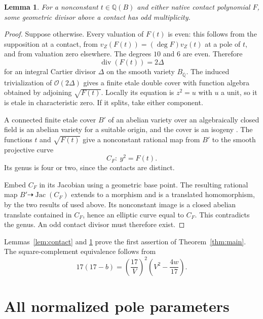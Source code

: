 \documentclass[11pt,a4paper]{article}
\newtheorem{lemma}[theorem]{Lemma}
\theoremstyle{remark}\newtheorem{remark}[theorem]{Remark}
\newcommand{\Q}{\mathbb Q}\newcommand{\Qbar}{\overline{\mathbb Q}}
\DeclareMathOperator{\divisor}{div}\DeclareMathOperator{\Jac}{Jac}
\begin{document}
\begin{lemma}\label{lem:oddexists}
For a nonconstant $t\in\Q(B)$ and either native contact polynomial
$F$, some geometric divisor above a contact has odd multiplicity.
\end{lemma}
\begin{proof}
Suppose otherwise. Every valuation of $F(t)$ is even: this follows
from the supposition at a contact, from
$v_Z(F(t))=(\deg F)v_Z(t)$ at a pole of $t$, and from valuation zero
elsewhere. The degrees $10$ and $6$ are even. Therefore
\[
                            \divisor(F(t))=2\Delta
\]
for an integral Cartier divisor $\Delta$ on the smooth variety
$B_{\Qbar}$. The induced trivialization of
$\mathcal O(2\Delta)$ gives a finite etale double cover with
function algebra obtained by adjoining $\sqrt{F(t)}$. Locally
its equation is $z^2=u$ with $u$ a unit, so it is etale in
characteristic zero. If it splits, take either component.

A connected finite etale cover $B'$ of an abelian variety over an
algebraically closed field is an abelian variety for a suitable
origin, and the cover is an isogeny \cite[Remark~15.3]{Milne}.
The functions $t$ and $\sqrt{F(t)}$ give a nonconstant rational map
from $B'$ to the smooth projective curve
\[
                              C_F:\ y^2=F(t).
\]
Its genus is four or two, since the contacts are distinct.

Embed $C_F$ in its Jacobian using a geometric base point. The
resulting rational map $B'\dashrightarrow\Jac(C_F)$ extends to
a morphism and is a translated homomorphism, by the two results
of \cite{Milne} used above. Its nonconstant image is a closed
abelian translate contained in $C_F$, hence an elliptic curve
equal to $C_F$. This contradicts the genus. An odd contact
divisor must therefore exist.
\end{proof}

Lemmas~\ref{lem:contact} and \ref{lem:oddexists} prove the first
assertion of Theorem~\ref{thm:main}. The square-complement
equivalence follows from
\[
       17(17-b)=\left(\frac{17}{V}\right)^2
                           \left(V^2-\frac{4w}{17}\right).
\]

\section{All normalized pole parameters}
\end{document}
